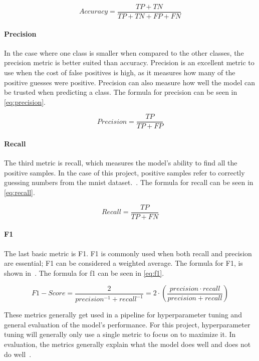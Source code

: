 \begin{equation}
    Accuracy = \frac{TP + TN}{TP + TN + FP + FN}
\end{equation}\label{eq:accuracy}

\paragraph{Precision} In the case where one class is smaller when compared to the other classes, the precision metric is better suited than accuracy. Precision is an excellent metric to use when the cost of false positives is high, as it measures how many of the positive guesses were positive. Precision can also measure how well the model can be trusted when predicting a class\cite{metrics-for-multi}. The formula for precision can be seen in \ref{eq:precision}.

\begin{equation}
    Precision = \frac{TP}{TP + FP}
\end{equation}\label{eq:precision}

\paragraph{Recall} The third metric is recall, which measures the model's ability to find all the positive samples. In the case of this project, positive samples refer to correctly guessing numbers from the \gls{mnist} dataset.~\cite{metrics-for-multi}. The formula for recall can be seen in \ref{eq:recall}.

\begin{equation}
    Recall = \frac{TP}{TP + FN}
\end{equation}\label{eq:recall}

\paragraph{F1} The last basic metric is F1. F1 is commonly used when both recall and precision are essential; F1 can be considered a weighted average. The formula for F1, is shown in~\cite{metrics-for-multi}. The formula for f1 can be seen in \ref{eq:f1}.

\begin{equation}
    F1-Score = \frac{2}{precision^{-1} + recall^{-1}} = 2\cdot (\frac{precision \cdot recall}{precision + recall})
\end{equation}\label{eq:f1}

These metrics generally get used in a pipeline for hyperparameter tuning and general evaluation of the model's performance. For this project, hyperparameter tuning will generally only use a single metric to focus on to maximize it. In evaluation, the metrics generally explain what the model does well and does not do well~\cite{james-statistical-learning}.






